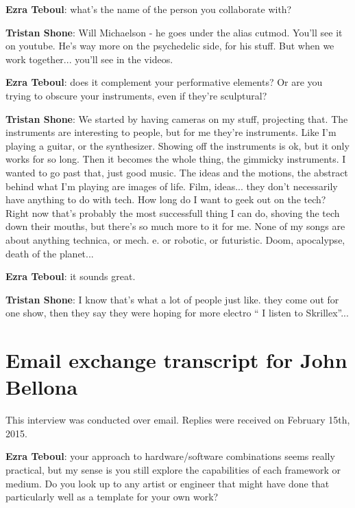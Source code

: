 \textbf{Ezra Teboul}: what's the name of the person you collaborate with? 

\textbf{Tristan Shone}: Will Michaelson - he goes under the alias cutmod. You'll see it on youtube. He's way more on the psychedelic side, for his stuff. But when we work together... you'll see in the videos. 

\textbf{Ezra Teboul}: does it complement your performative elements? Or are you trying to obscure your instruments, even if they're sculptural? 

\textbf{Tristan Shone}: We started by having cameras on my stuff, projecting that. The instruments are interesting to people, but for me they're instruments. Like I'm playing a guitar, or the synthesizer. Showing off the instruments is ok, but it only works for so long. Then it becomes the whole thing, the gimmicky instruments. I wanted to go past that, just good music. The ideas and the motions, the abstract behind what I'm playing are images of life. Film, ideas... they don't necessarily have anything to do with tech. How long do I want to geek out on the tech? Right now that's probably the most successfull thing I can do, shoving the tech down their mouths, but there's so much more to it for me. None of my songs are about anything technica, or mech. e. or robotic, or futuristic. Doom, apocalypse, death of the planet... 

\textbf{Ezra Teboul}: it sounds great. 

\textbf{Tristan Shone}: I know that's what a lot of people just like. they come out for one show, then they say they were hoping for more electro `` I listen to Skrillex''... 

\newpage

\clearpage 

\section{Email exchange transcript for John Bellona}

This interview was conducted over email. Replies were received on February 15th, 2015. 

\textbf{Ezra Teboul}: your approach to hardware/software combinations seems really
practical, but my sense is you still explore the capabilities of each framework or
medium. Do you look up to any artist or engineer that might have done that particularly
well as a template for your own work?

